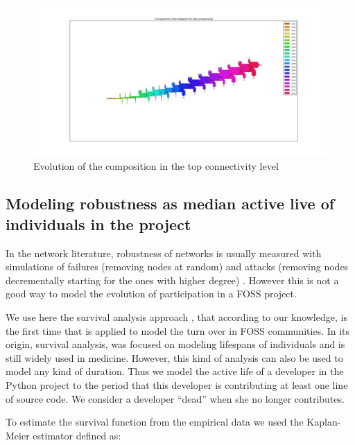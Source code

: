 \begin{landscape}
\begin{figure}[p]
\begin{center}
\includegraphics[scale=0.4]{figures/sankey_python}
\caption[Sankey diagram of the composition of each connectivity level.]{Evolution of the composition in the top connectivity level}
\label{fig:sankey}
\end{center}
\end{figure}
\end{landscape}


\subsection{Modeling robustness as median active live of individuals in the project}

In the network literature, robustness of networks is usually measured with simulations of failures (removing nodes at random) and attacks (removing nodes decrementally starting for the ones with higher degree) \citep{albert:2000}. However this is not a good way to model the evolution of participation in a FOSS project.

We use here the survival analysis approach \citep{miller:2011}, that according to our knowledge, is the first time that is applied to model the turn over in FOSS communities. In its origin, survival analysis, was focused on modeling lifespans of individuals and is still widely used in medicine. However, this kind of analysis can also be used to model any kind of duration. Thus we model the active life of a developer in the Python project to the period that this developer is contributing at least one line of source code. We consider a developer ``dead'' when she no longer contributes.

To estimate the survival function from the empirical data we used the Kaplan-Meier estimator \citep{kaplan:1958} defined as:

